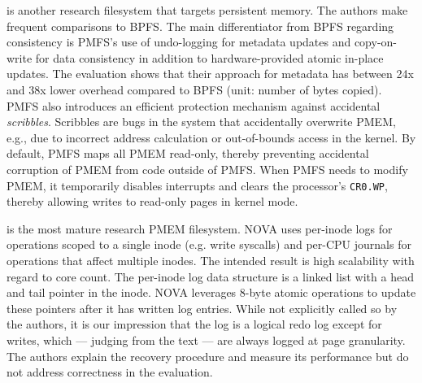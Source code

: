 \documentclass[12pt,a4paper,twoside]{book}
\begin{document}
 is another research filesystem that targets persistent memory.
The authors make frequent comparisons to BPFS.
The main differentiator from BPFS regarding consistency is PMFS’s use of undo-logging for metadata updates and copy-on-write for data consistency in addition to hardware-provided atomic in-place updates.
The evaluation shows that their approach for metadata has between 24x and 38x lower overhead compared to BPFS (unit: number of bytes copied).
PMFS also introduces an efficient protection mechanism against accidental \textit{scribbles}.
Scribbles are bugs in the system that accidentally overwrite PMEM, e.g., due to incorrect address calculation or out-of-bounds access in the kernel.
By default, PMFS maps all PMEM read-only, thereby preventing accidental corruption of PMEM from code outside of PMFS.
When PMFS needs to modify PMEM, it temporarily disables interrupts and clears the processor's \lstinline{CR0.WP}, thereby allowing writes to read-only pages in kernel mode.~\cite{dulloorSystemSoftwarePersistent2014,intelSdmCr0WpFlag}

 is the most mature research PMEM filesystem.
NOVA uses per-inode logs for operations scoped to a single inode (e.g. write syscalls) and per-CPU journals for operations that affect multiple inodes.
The intended result is high scalability with regard to core count.
The per-inode log data structure is a linked list with a head and tail pointer in the inode.
NOVA leverages 8-byte atomic operations to update these pointers after it has written log entries.
While not explicitly called so by the authors, it is our impression that the log is a logical redo log except for writes, which --- judging from the text --- are always logged at page granularity.
The authors explain the recovery procedure and measure its performance but do not address correctness in the evaluation.
\end{document}
